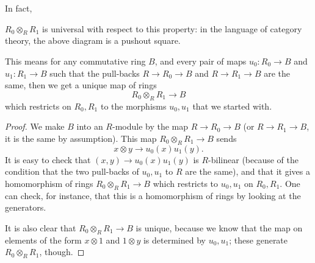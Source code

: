 In fact, 
\begin{proposition} 
$R_0 \otimes_R R_1$ is universal with respect to this property: in the language
of category theory, the above diagram is a pushout square.
\end{proposition} 

This means for any commutative ring $B$, and every pair of maps $u_0: R_0 \to
B$ and $u_1: R_1 \to B$ such that the pull-backs $R \to R_0 \to B$ and $R \to
R_1 \to B$ are the same, then we get a unique map of rings
\[ R_0 \otimes_R R_1 \to B  \]
which restricts on $R_0, R_1$ to the morphisms $u_0, u_1$ that we started with. 
\begin{proof} We make $B$ into an $R$-module by the map $R \to R_0 \to B$ (or
$R \to R_1 \to B$, it is the same by assumption). 
This map $R_0 \otimes_R R_1 \to B$ sends
\[ x \otimes y \to u_0(x) u_1(y).  \]
It is easy to check that $(x,y) \to u_0(x)u_1(y)$ is $R$-bilinear (because of
the condition that the two pull-backs of $u_0, u_1$ to $R$ are the same), and
that it gives a homomorphism of rings $R_0 \otimes_R R_1 \to B$ which restricts to $u_0, u_1$ on $R_0,
R_1$. One can check, for instance, that this is a homomorphism of rings by
looking at the generators.

It is also clear that $R_0 \otimes_R R_1 \to B$ is unique, because we know that the
map on elements of the form $x \otimes 1$ and $1 \otimes y$ is determined by
$u_0, u_1$; these generate $R_0 \otimes_R R_1$, though.
\end{proof}


